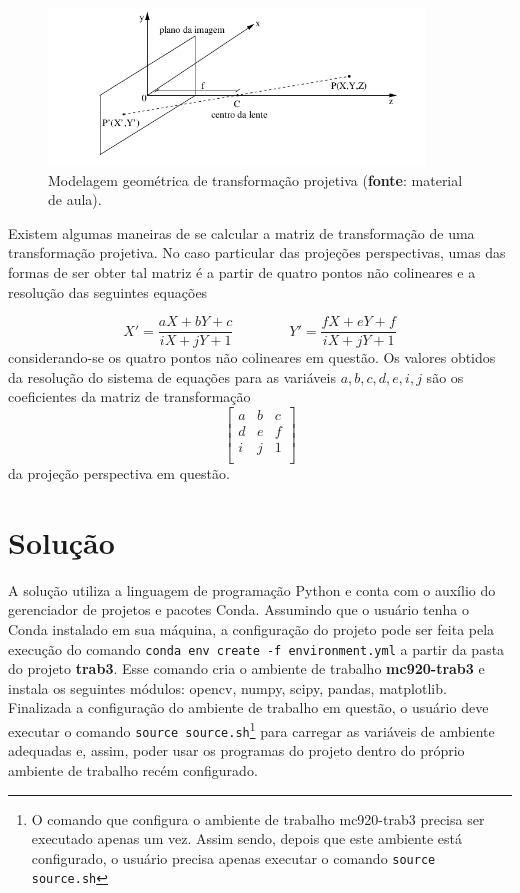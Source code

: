 \documentclass{article}
\begin{document}
\begin{figure}[!htp]%
	\centering
	\includegraphics[width=10cm]{transformacaoprojetiva.png}
	\caption{Modelagem geométrica de transformação projetiva (\textbf{fonte}: material de aula).}%
	\label{fig:transpro}%
\end{figure}

\newpage
Existem algumas maneiras de se calcular a matriz de transformação de uma transformação projetiva. No caso particular das projeções perspectivas, umas das formas de ser obter tal matriz é a partir de quatro pontos não colineares e a resolução das seguintes equações

\begin{equation}
X' = \frac{aX + bY + c}{iX + jY + 1}
\qquad\qquad
Y' = \frac{fX + eY + f}{iX + jY + 1}
\label{eq:transpes}
\end{equation}
considerando-se os quatro pontos não colineares em questão. Os valores obtidos da resolução do sistema de equações para as variáveis $a,b,c,d,e,i,j$ são os coeficientes da matriz de transformação 
\[
\begin{bmatrix} 
	a & b & c \\
	d & e & f \\
	i & j & 1 \\
\end{bmatrix}
\]
da projeção perspectiva em questão.

%
\section{Solução}
A solução utiliza a linguagem de programação Python e conta com o auxílio do gerenciador de projetos e pacotes Conda. Assumindo que o usuário tenha o Conda instalado em sua máquina, a configuração do projeto pode ser feita pela execução do comando \lstinline{conda env create -f environment.yml} a partir da pasta do projeto \textbf{trab3}. Esse comando cria o ambiente de trabalho \textbf{mc920-trab3} e instala os seguintes módulos: opencv, numpy, scipy, pandas, matplotlib. Finalizada a configuração do ambiente de trabalho em questão, o usuário deve executar o comando \lstinline{source source.sh}\footnote{O comando que configura o ambiente de trabalho mc920-trab3 precisa ser executado apenas um vez. Assim sendo, depois que este ambiente está configurado, o usuário precisa apenas executar o comando \lstinline{source source.sh}} para carregar as variáveis de ambiente adequadas e, assim, poder usar os programas do projeto dentro do próprio ambiente de trabalho recém configurado. 
\end{document}
